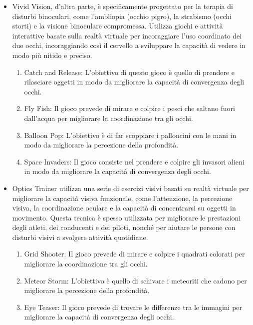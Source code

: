 \documentclass[
a4paper,
cleardoublepage=empty,
headings=twolinechapter,
numbers=autoenddot,
]{scrbook}
\begin{document}
\begin{itemize}
	    \item Vivid Vision, d'altra parte, è specificamente progettato per la terapia di disturbi binoculari, come l'ambliopia (occhio pigro), la strabismo (occhi storti) e la visione binoculare compromessa. Utilizza giochi e attività interattive basate sulla realtà virtuale per incoraggiare l'uso coordinato dei due occhi, incoraggiando così il cervello a sviluppare la capacità di vedere in modo più nitido e preciso.
	    \begin{enumerate}
	    	\item Catch and Release: L'obiettivo di questo gioco è quello di prendere e rilasciare oggetti in modo da migliorare la capacità di convergenza degli occhi.
	    	\item Fly Fish: Il gioco prevede di mirare e colpire i pesci che saltano fuori dall'acqua per migliorare la coordinazione tra gli occhi.
	    	\item Balloon Pop: L'obiettivo è di far scoppiare i palloncini con le mani in modo da migliorare la percezione della profondità.
	    	\item Space Invaders: Il gioco consiste nel prendere e colpire gli invasori alieni in modo da migliorare la capacità di convergenza degli occhi.
	    \end{enumerate}
	    
	    \item Optics Trainer utilizza una serie di esercizi visivi basati su realtà virtuale per migliorare la capacità visiva funzionale, come l'attenzione, la percezione visiva, la coordinazione oculare e la capacità di concentrarsi su oggetti in movimento. Questa tecnica è spesso utilizzata per migliorare le prestazioni degli atleti, dei conducenti e dei piloti, nonché per aiutare le persone con disturbi visivi a svolgere attività quotidiane.
	    \begin{enumerate}
	    	\item Grid Shooter: Il gioco prevede di mirare e colpire i quadrati colorati per migliorare la coordinazione tra gli occhi.
	    	\item Meteor Storm: L'obiettivo è quello di schivare i meteoriti che cadono per migliorare la percezione della profondità.
	    	\item Eye Teaser: Il gioco prevede di trovare le differenze tra le immagini per migliorare la capacità di convergenza degli occhi. 
	    \end{enumerate}
	
	\end{itemize}
	
\end{document}
